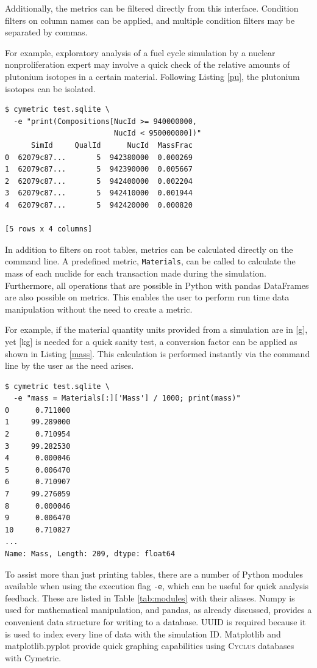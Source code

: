 \documentclass{anstrans}
\newcommand{\cyclus}{\textsc{Cyclus}\xspace}
\newcommand{\code}[1]{{\color{code}\texttt{#1}}}
\begin{document}
Additionally, the metrics can be filtered directly from this interface.
Condition filters on column names can be applied, and multiple condition
filters may be separated by commas. 

For example, exploratory analysis of a fuel cycle simulation by a nuclear nonproliferation expert may involve a quick check of the relative amounts of plutonium isotopes in a certain material. Following Listing \ref{pu}, the plutonium isotopes can be isolated. 

\begin{lstlisting}[caption ={Filtering a Root Table}, label=pu]
$ cymetric test.sqlite \
  -e "print(Compositions[NucId >= 940000000, 
                         NucId < 950000000])"
      SimId     QualId      NucId  MassFrac
0  62079c87...       5  942380000  0.000269
1  62079c87...       5  942390000  0.005667
2  62079c87...       5  942400000  0.002204
3  62079c87...       5  942410000  0.001944
4  62079c87...       5  942420000  0.000820

[5 rows x 4 columns]
\end{lstlisting}

In addition to filters on root tables, metrics can  be calculated directly 
on the command line. A predefined metric, \code{Materials}, can be called 
to calculate the mass of each nuclide for each transaction made during 
the simulation. Furthermore, all operations that are possible in Python 
with pandas DataFrames are also possible on metrics.  This enables the user
to perform run time data manipulation without the need to create a metric.

For example, if the material quantity units provided from a simulation are in [g], yet [kg] is needed for a quick sanity test, 
a conversion factor can be applied as shown in Listing \ref{mass}. This calculation is performed instantly via the command line by the user as the need arises. 

\begin{lstlisting}[caption ={Calculating and Manipulating Metrics}, label=mass]
$ cymetric test.sqlite \
  -e "mass = Materials[:]['Mass'] / 1000; print(mass)"
0      0.711000
1     99.289000
2      0.710954
3     99.282530
4      0.000046
5      0.006470
6      0.710907
7     99.276059
8      0.000046
9      0.006470
10     0.710827
...
Name: Mass, Length: 209, dtype: float64
\end{lstlisting}

To assist more than just printing tables, there are a number of Python 
modules available when using the execution flag \code{-e}, which can be useful for quick analysis feedback. 
These are listed in Table \ref{tab:modules} with their aliases. Numpy is used for mathematical manipulation, and pandas, as already discussed, provides a convenient data structure for writing to a database. UUID is required because it is used to index every line of data with the simulation ID. Matplotlib and matplotlib.pyplot provide quick graphing capabilities using \cyclus databases with Cymetric.
 
\end{document}
